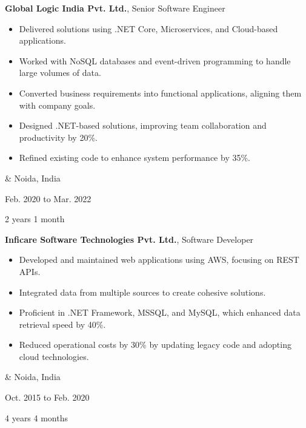 \documentclass[10pt, letterpaper]{article}
\newenvironment{highlights}{
        \begin{itemize}[
                topsep=0pt,
                parsep=0.10 cm,
                partopsep=0pt,
                itemsep=0pt,
                after=\vspace{-1\baselineskip},
                leftmargin=0.4 cm + 3pt
            ]
    }{
        \end{itemize}
    } %
\let\originalTabularx\tabularx
\let\originalEndTabularx\endtabularx
\renewenvironment{tabularx}{\bgroup\centering\originalTabularx}{\originalEndTabularx\par\egroup}
\begin{document}
        \vspace{0.2 cm}
        \begin{tabularx}{
            \textwidth-0.4 cm-0.13cm
        }{
            K{0.2 cm}
            R{4.1 cm}
        }
            \textbf{Global Logic India Pvt. Ltd.}, Senior Software Engineer

            \vspace{0.10 cm}

            \begin{highlights}
                \item Delivered solutions using .NET Core, Microservices, and Cloud-based applications.
                \item Worked with NoSQL databases and event-driven programming to handle large volumes of data.
                \item Converted business requirements into functional applications, aligning them with company goals.
                \item Designed .NET-based solutions, improving team collaboration and productivity by 20\%.
                \item Refined existing code to enhance system performance by 35\%.
            \end{highlights}
            &
            Noida, India

            Feb. 2020 to Mar. 2022

            2 years 1 month
        \end{tabularx}

        \vspace{0.2 cm}
        \begin{tabularx}{
            \textwidth-0.4 cm-0.13cm
        }{
            K{0.2 cm}
            R{4.1 cm}
        }
            \textbf{Inficare Software Technologies Pvt. Ltd.}, Software Developer

            \vspace{0.10 cm}

            \begin{highlights}
                \item Developed and maintained web applications using AWS, focusing on REST APIs.
                \item Integrated data from multiple sources to create cohesive solutions.
                \item Proficient in .NET Framework, MSSQL, and MySQL, which enhanced data retrieval speed by 40\%.
                \item Reduced operational costs by 30\% by updating legacy code and adopting cloud technologies.
            \end{highlights}
            &
            Noida, India

            Oct. 2015 to Feb. 2020

            4 years 4 months
        \end{tabularx}
\end{document}
